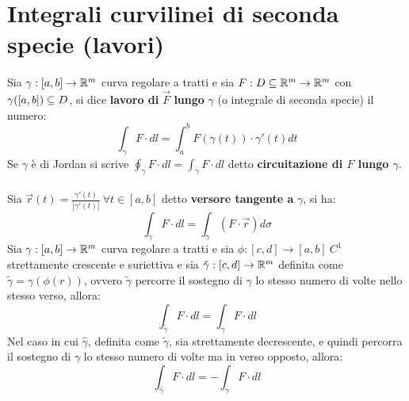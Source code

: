 	\section{Integrali curvilinei di seconda specie (lavori)}
	Sia $\gamma:[a, b] \rightarrow \mathbb{R}^m$ curva regolare a tratti e  sia $F:D\subseteq \mathbb{R}^m \rightarrow \mathbb{R}^m$ con $\gamma([a,b])\subseteq D$, si dice \textbf{lavoro di} $\vec F$ \textbf{lungo} $\gamma$ (o integrale di seconda specie) il numero:
	$$\int_\gamma F \cdot dl = \int_a^bF(\gamma(t))\cdot \gamma'(t) dt$$
	Se $\gamma$ è di Jordan si scrive $\oint_\gamma F \cdot dl = \int_\gamma F \cdot dl$ detto \textbf{circuitazione di $F$ lungo $\gamma$}.\\
	\\
	Sia $\vec r(t)= \frac{\gamma'(t)}{|\gamma'(t)|}\ \forall t \in [a,b]$ detto \textbf{versore tangente a} $\gamma$, si ha:
	$$\int_\gamma F \cdot dl = \int_\gamma (F\cdot \vec r) d\sigma$$
	\prop
	Sia $\gamma:[a, b] \rightarrow \mathbb{R}^m$ curva regolare a tratti e sia $\phi : [c, d] \rightarrow [a, b] \ C^1$ strettamente crescente e suriettiva e sia $\tilde{\gamma} : [c, d]\rightarrow \mathbb{R}^m$ definita come $\tilde{\gamma}=\gamma ( \phi (r) )$, ovvero $\tilde{\gamma}$ percorre il sostegno di $\gamma$ lo stesso numero di volte nello stesso verso, allora:
	$$\int_{\tilde{\gamma}} F \cdot dl = \int_\gamma F \cdot dl$$
	Nel caso in cui $\hat \gamma$, definita come $\tilde{\gamma}$, sia strettamente decrescente, e quindi percorra il sostegno di $\gamma$ lo stesso numero di volte ma in verso opposto, allora:
	$$\int_{\hat{\gamma}} F \cdot dl = - \int_\gamma F \cdot dl$$
